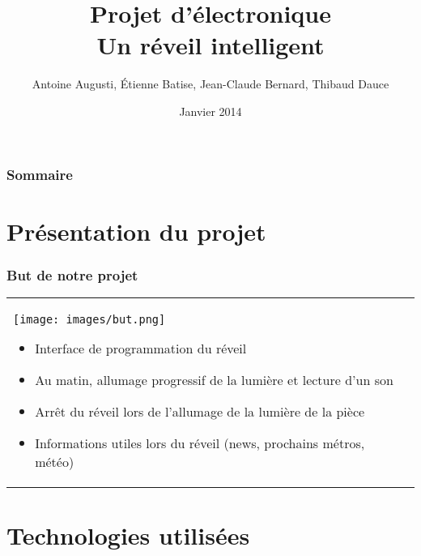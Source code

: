 \documentclass[handout]{beamer}
\title[Quantic]{
	Projet d'électronique\\
	Un réveil intelligent
}
\author{
	Antoine Augusti, Étienne Batise, Jean-Claude Bernard, Thibaud Dauce
}
\date{Janvier 2014}
\begin{document}
	
	\begin{frame}[plain]
		\titlepage
	\end{frame}

	\begin{frame}[plain]
		\frametitle{Sommaire}
		\tableofcontents
	\end{frame}


	\section{Présentation du projet}

	\begin{frame}
	\frametitle{But de notre projet}
	\begin{tabular}{l l}
		\begin{minipage}{0.2\textwidth}
			\begin{center}
				\texttt{[image: images/but.png]}
			\end{center}
		\end{minipage}

		\begin{minipage}{0.8\textwidth}
			\begin{itemize}
				\item Interface de programmation du réveil
				\item Au matin, allumage progressif de la lumière et lecture d'un son
				\item Arrêt du réveil lors de l'allumage de la lumière de la pièce
				\item Informations utiles lors du réveil (news, prochains métros, météo)
			\end{itemize}
		\end{minipage}
		
	\end{tabular}
	\end{frame}


	\section{Technologies utilisées}
\end{document}
